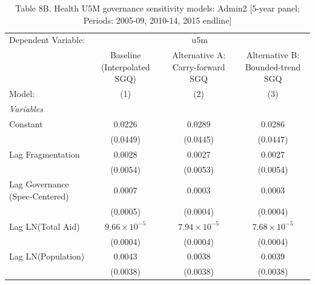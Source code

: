 
\begin{table}[H]
   \caption{Table 8B. Health U5M governance sensitivity models: Admin2 [5-year panel; Periods: 2005-09, 2010-14, 2015 endline]}
   \centering
   \begin{tabular}{lccc}
      \tabularnewline \midrule \midrule
      Dependent Variable: & \multicolumn{3}{c}{u5m}\\
                                                         & Baseline (Interpolated SGQ) & Alternative A: Carry-forward SGQ & Alternative B: Bounded-trend SGQ \\   
      Model:                                             & (1)                         & (2)                              & (3)\\  
      \midrule
      \emph{Variables}\\
      Constant                                           & 0.0226                      & 0.0289                           & 0.0286\\   
                                                         & (0.0449)                    & (0.0445)                         & (0.0447)\\   
      Lag Fragmentation                                  & 0.0028                      & 0.0027                           & 0.0027\\   
                                                         & (0.0054)                    & (0.0053)                         & (0.0054)\\   
      Lag Governance (Spec-Centered)                     & 0.0007                      & 0.0003                           & 0.0003\\   
                                                         & (0.0005)                    & (0.0004)                         & (0.0004)\\   
      Lag LN(Total Aid)                                  & $9.66\times 10^{-5}$        & $7.94\times 10^{-5}$             & $7.68\times 10^{-5}$\\    
                                                         & (0.0004)                    & (0.0004)                         & (0.0004)\\   
      Lag LN(Population)                                 & 0.0043                      & 0.0038                           & 0.0039\\   
                                                         & (0.0038)                    & (0.0038)                         & (0.0038)\\   

\end{tabular}
\end{table}
